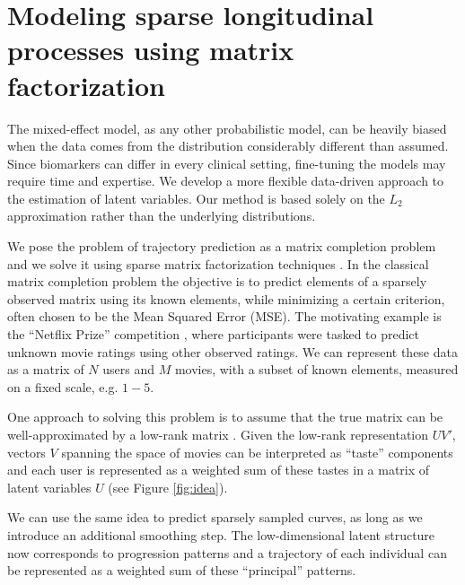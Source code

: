 \documentclass[preprint]{imsart}
\numberwithin{equation}{section}
\theoremstyle{plain}
\begin{document}

\section{Modeling sparse longitudinal processes using matrix factorization}\label{s:context}


The mixed-effect model, as any other probabilistic model, can be heavily biased when the data comes from the distribution considerably different than assumed. Since biomarkers can differ in every clinical setting, fine-tuning the models may require time and expertise. We develop a more flexible data-driven approach to the estimation of latent variables. Our method is based solely on the $L_2$ approximation rather than the underlying distributions.

We pose the problem of trajectory prediction as a matrix completion problem and we solve it using sparse matrix factorization techniques \citep{rennie2005fast, candes2009exact}. In the classical matrix completion problem the objective is to predict elements of a sparsely observed matrix using its known elements, while minimizing a certain criterion, often chosen to be the Mean Squared Error (MSE). The motivating example is the ``Netflix Prize'' competition \citep{bennett2007netflix}, where participants were tasked to predict unknown movie ratings using other observed ratings. We can represent these data as a matrix of $N$ users and $M$ movies, with a subset of known elements, measured on a fixed scale, e.g. $1-5$.

One approach to solving this problem is to assume that the true matrix can be well-approximated by a low-rank matrix \citep{srebro2005generalization}. Given the low-rank representation $UV'$, vectors $V$ spanning the space of movies can be interpreted as ``taste'' components and each user is represented as a weighted sum of these tastes in a matrix of latent variables $U$ (see Figure \ref{fig:idea}).

We can use the same idea to predict sparsely sampled curves, as long as we introduce an additional smoothing step. The low-dimensional latent structure now corresponds to progression patterns and a trajectory of each individual can be represented as a weighted sum of these ``principal'' patterns.
\end{document}
